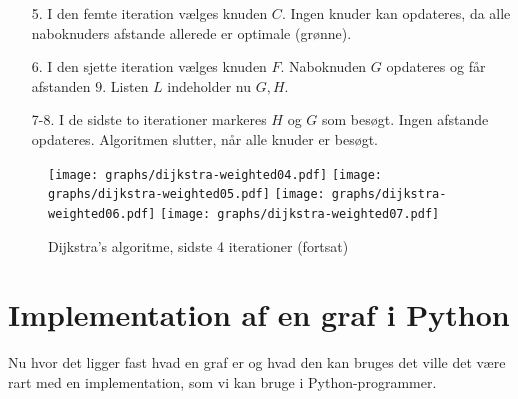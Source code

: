 \documentclass[10pt,a4paper,danish]{article}
\begin{document}
\newpage

\begin{enumerate}
\item[5.] I den femte iteration vælges knuden $C$. Ingen knuder kan
  opdateres, da alle naboknuders afstande allerede er optimale
  (grønne).

\item[6.] I den sjette iteration vælges knuden $F$. Naboknuden $G$
  opdateres og får afstanden $9$. Listen $L$ indeholder nu $G,H$.


\item[7-8.] I de sidste to iterationer markeres $H$ og $G$ som
  besøgt. Ingen afstande opdateres. Algoritmen slutter, når alle
  knuder er besøgt.
\end{enumerate}

\begin{figure}[h]\centering
\texttt{[image: graphs/dijkstra-weighted04.pdf]}
\texttt{[image: graphs/dijkstra-weighted05.pdf]}
\texttt{[image: graphs/dijkstra-weighted06.pdf]}
\texttt{[image: graphs/dijkstra-weighted07.pdf]}
\caption{Dijkstra's algoritme, sidste 4 iterationer (fortsat)}
\label{fig:dijkstraw1}
\end{figure}








\newpage
\section{Implementation af en graf i Python}
Nu hvor det ligger fast hvad en graf er og hvad den kan bruges det
ville det være rart med en implementation, som vi kan bruge i
Python-programmer.
\end{document}
